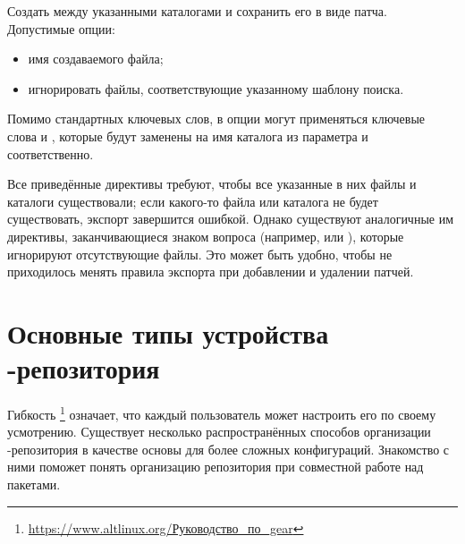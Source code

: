 \begin{itemize}
	Создать  между указанными каталогами и сохранить его в виде патча. Допустимые опции:
	\begin{itemize}
		\item {} имя создаваемого файла;
		\item {} игнорировать файлы, соответствующие указанному шаблону поиска.
	\end{itemize}
	
	Помимо стандартных ключевых слов, в опции  могут применяться ключевые слова  
		и , которые будут заменены на имя каталога из параметра  
		и  соответственно. 
\end{itemize}

Все приведённые директивы требуют, чтобы все указанные в них файлы и каталоги существовали; если какого-то 
файла или каталога не будет существовать, экспорт завершится ошибкой. Однако существуют аналогичные им директивы, 
заканчивающиеся знаком вопроса (например,  или ), которые игнорируют отсутствующие файлы. 
Это может быть удобно, чтобы не приходилось менять правила экспорта при добавлении и удалении патчей.


\section{Основные типы устройства -репозитория}
Гибкость \footnote{\href{https://www.altlinux.org/\%D0\%A0\%D1\%83\%D0\%BA\%D0\%BE\%D0\%B2\%D0\%BE\%D0\%B4\%D1\%81\%D1\%82\%D0\%B2\%D0\%BE_\%D0\%BF\%D0\%BE_gear}{https://www.altlinux.org/Руководство\_по\_gear}} 
означает, что каждый пользователь может настроить его по своему усмотрению. Существует несколько 
распространённых способов организации -репозитория в качестве основы для более сложных конфигураций. 
Знакомство с ними поможет понять организацию репозитория при совместной работе над пакетами. 

